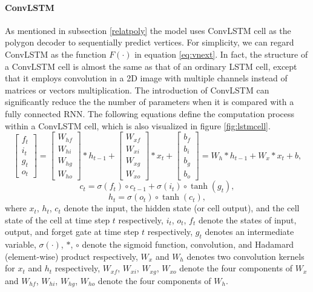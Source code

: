 \paragraph{ConvLSTM} As mentioned in subsection \ref{relatpoly} the model uses ConvLSTM cell as the polygon decoder to sequentially predict vertices. For simplicity, we can regard ConvLSTM as the function $F(\cdot)$ in equation \ref{eq:vnext}. In fact, the structure of a ConvLSTM cell is almost the same as that of an ordinary LSTM cell, except that it employs convolution in a 2D image with multiple channels instead of matrices or vectors multiplication. The introduction of ConvLSTM can significantly reduce the the number of parameters when it is compared with a fully connected RNN. The following equations define the computation process within a ConvLSTM cell, which is also visualized in figure \ref{fig:lstmcell}.
\begin{equation}
	\left[\begin{array}{c}
		f_t\\i_t\\g_t\\o_t
	\end{array}\right] = \left[\begin{array}{c}
		W_{hf}\\W_{hi}\\W_{hg}\\W_{ho}
	\end{array}\right] * h_{t-1} + \left[\begin{array}{c}
		W_{xf}\\W_{xi}\\W_{xg}\\W_{xo}
	\end{array}\right] * x_{t} + \left[\begin{array}{c}
		b_f\\b_i\\b_g\\b_o
	\end{array}\right] = W_h * h_{t-1} + W_x * x_t + b,
\end{equation}
\begin{equation}
	c_t = \sigma(f_t) \circ c_{t-1} + \sigma(i_t) \circ \tanh(g_t),
\end{equation}
\begin{equation}
	h_t = \sigma(o_t) \circ \tanh(c_t),
\end{equation}
where $x_t$, $h_t$, $c_t$ denote the input, the hidden state (or cell output), and the cell state of the cell at time step $t$ respectively, $i_t$, $o_t$, $f_t$ denote the states of input, output, and forget gate at time step $t$ respectively, $g_t$ denotes an intermediate variable, $\sigma(\cdot)$, $*$, $\circ$ denote the sigmoid function, convolution, and Hadamard (element-wise) product respectively, $W_x$ and $W_h$ denotes two convolution kernels for $x_t$ and $h_t$ respectively, $W_{xf}$, $W_{xi}$, $W_{xg}$, $W_{xo}$ denote the four components of $W_x$ and $W_{hf}$, $W_{hi}$, $W_{hg}$, $W_{ho}$ denote the four components of $W_h$.

